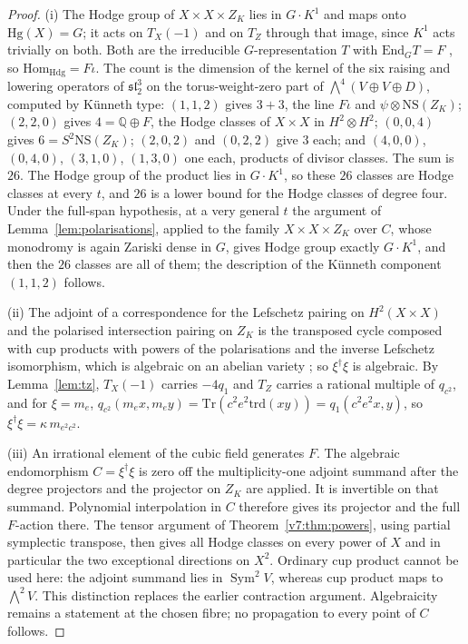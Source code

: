 \documentclass[11pt,reqno]{amsart}
\numberwithin{equation}{section}
\theoremstyle{plain}
\theoremstyle{definition}
\newcommand{\QQ}{\mathbb{Q}}
\newcommand{\Hdg}{\mathrm{Hdg}}
\newcommand{\Hg}{\mathrm{Hg}}
\newcommand{\NS}{\mathrm{NS}}
\newcommand{\Hom}{\mathrm{Hom}}
\newcommand{\End}{\mathrm{End}}
\newcommand{\Tr}{\mathrm{Tr}}
\newcommand{\trd}{\mathrm{trd}}
\begin{document}
\begin{proof}
(i) The Hodge group of $X\times X\times Z_{K}$ lies in $G\cdot K^{1}$ and maps onto $\Hg(X)=G$; it acts on $T_{X}(-1)$ and on $T_{Z}$ through that image, since $K^{1}$ acts trivially on both. Both are the irreducible $G$-representation $T$ with $\End_{G}T=F$ \cite[Prop.~21.2]{BMB26}, so $\Hom_{\Hdg}=F\iota$. The count is the dimension of the kernel of the six raising and lowering operators of $\mathfrak{sl}_{2}^{3}$ on the torus-weight-zero part of $\bigwedge^{4}(V\oplus V\oplus D)$, computed by K\"unneth type: $(1,1,2)$ gives $3+3$, the line $F\iota$ and $\psi\otimes\NS(Z_{K})$; $(2,2,0)$ gives $4=\QQ\oplus F$, the Hodge classes of $X\times X$ in $H^{2}\otimes H^{2}$; $(0,0,4)$ gives $6=S^{2}\NS(Z_{K})$; $(2,0,2)$ and $(0,2,2)$ give $3$ each; and $(4,0,0)$, $(0,4,0)$, $(3,1,0)$, $(1,3,0)$ one each, products of divisor classes. The sum is $26$. The Hodge group of the product lies in $G\cdot K^{1}$, so these $26$ classes are Hodge classes at every $t$, and $26$ is a lower bound for the Hodge classes of degree four. Under the full-span hypothesis, at a very general $t$ the argument of Lemma~\ref{lem:polarisations}, applied to the family $X\times X\times Z_{K}$ over $C$, whose monodromy is again Zariski dense in $G$, gives Hodge group exactly $G\cdot K^{1}$, and then the $26$ classes are all of them; the description of the K\"unneth component $(1,1,2)$ follows.

(ii) The adjoint of a correspondence for the Lefschetz pairing on $H^{2}(X\times X)$ and the polarised intersection pairing on $Z_{K}$ is the transposed cycle composed with cup products with powers of the polarisations and the inverse Lefschetz isomorphism, which is algebraic on an abelian variety \cite[\S2]{Kle68}; so $\xi^{\dagger}\xi$ is algebraic. By Lemma~\ref{lem:tz}, $T_{X}(-1)$ carries $-4q_{1}$ and $T_{Z}$ carries a rational multiple of $q_{c^{2}}$, and for $\xi=m_{e}$, $q_{c^{2}}(m_{e}x,m_{e}y)=\Tr(c^{2}e^{2}\trd(xy))=q_{1}(c^{2}e^{2}x,y)$, so $\xi^{\dagger}\xi=\kappa\,m_{e^{2}c^{2}}$.

(iii) An irrational element of the cubic field generates $F$. The algebraic endomorphism $C=\xi^{\dagger}\xi$ is zero off the multiplicity-one adjoint summand after the degree projectors and the projector on $Z_K$ are applied. It is invertible on that summand. Polynomial interpolation in $C$ therefore gives its projector and the full $F$-action there. The tensor argument of Theorem~\ref{v7:thm:powers}, using partial symplectic transpose, then gives all Hodge classes on every power of $X$ and in particular the two exceptional directions on $X^2$. Ordinary cup product cannot be used here: the adjoint summand lies in $\operatorname{Sym}^{2}V$, whereas cup product maps to $\bigwedge^{2}V$. This distinction replaces the earlier contraction argument. Algebraicity remains a statement at the chosen fibre; no propagation to every point of $C$ follows.


\end{proof}
\end{document}
